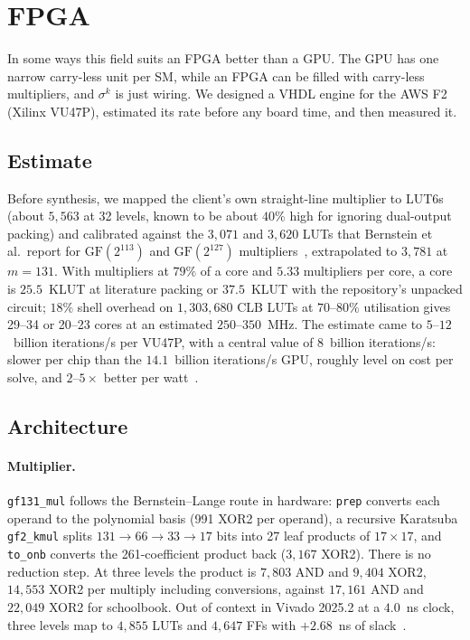 \section{FPGA}
\label{sec:fpga}

In some ways this field suits an FPGA better than a GPU. The GPU has
one narrow carry-less unit per SM, while an FPGA can be filled with
carry-less multipliers, and $\sigma^k$ is just wiring. We designed a
VHDL engine for the AWS F2 (Xilinx VU47P), estimated its rate before
any board time, and then measured it.

\subsection{Estimate}
\label{sec:fpga-estimate}

Before synthesis, we mapped the client's own straight-line multiplier
to LUT6s (about $5{,}563$ at 32 levels, known to be about $40\%$
high for ignoring dual-output packing) and calibrated against the
$3{,}071$ and $3{,}620$ LUTs that Bernstein et al.\ report for
$\mathrm{GF}(2^{113})$ and $\mathrm{GF}(2^{127})$
multipliers~\cite{bernstein2016fpga}, extrapolated to $3{,}781$ at
$m=131$. With multipliers at $79\%$ of a core and $5.33$ multipliers
per core, a core is $25.5$~KLUT at literature packing or $37.5$~KLUT
with the repository's unpacked circuit; $18\%$ shell overhead on
$1{,}303{,}680$ CLB LUTs at $70$--$80\%$ utilisation gives 29--34 or
20--23 cores at an estimated $250$--$350$~MHz. The estimate came to
$5$--$12$~billion iterations/s per VU47P, with a central value of $8$~billion iterations/s:
slower per chip than the $14.1$~billion iterations/s GPU, roughly level on cost per
solve, and $2$--$5\times$ better per watt~.

\subsection{Architecture}
\label{sec:fpga-design}

\paragraph{Multiplier.} \texttt{gf131\_mul} follows the Bernstein--Lange
route in hardware: \texttt{prep} converts each operand to the
polynomial basis (991 XOR2 per operand), a recursive Karatsuba
\texttt{gf2\_kmul} splits $131\to66\to33\to17$ bits into 27 leaf
products of $17\times17$, and \texttt{to\_onb} converts the
261-coefficient product back ($3{,}167$ XOR2). There is no reduction
step. At three levels the product is $7{,}803$ AND and $9{,}404$ XOR2,
$14{,}553$ XOR2 per multiply including conversions, against $17{,}161$
AND and $22{,}049$ XOR2 for schoolbook. Out of context in Vivado 2025.2
at a $4.0$~ns clock, three levels map to $4{,}855$ LUTs and $4{,}647$
FFs with $+2.68$~ns of slack~.

